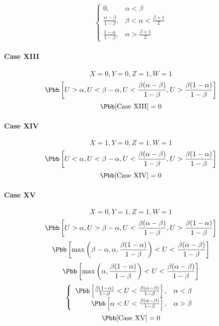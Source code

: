 \begin{displaymath}
\left\{\begin{array}{rl}
0, & \alpha < \beta\\
\frac{\alpha-\beta}{1-\beta}, & \beta < \alpha < \frac{\beta + 1}{2}\\
\frac{1-\alpha}{1-\beta}, & \alpha > \frac{\beta + 1}{2}
\end{array}\right.
\end{displaymath}

\paragraph{Case XIII}
\[X = 0, Y = 0, Z = 1, W = 1\]
\[\Pbb\left[U > \alpha, U < \beta-\alpha, U < \frac{\beta(\alpha-\beta)}{1-\beta}, U > \frac{\beta(1-\alpha)}{1-\beta}\right]\]
\[\Pbb[\mbox{Case XIII}] = 0\]

\paragraph{Case XIV}
\[X = 1, Y = 0, Z = 1, W = 1\]
\[\Pbb\left[U < \alpha, U < \beta-\alpha, U < \frac{\beta(\alpha-\beta)}{1-\beta}, U > \frac{\beta(1-\alpha)}{1-\beta}\right]\]
\[\Pbb[\mbox{Case XIV}] = 0\]

\paragraph{Case XV}
\[X = 0, Y = 1, Z = 1, W = 1\]
\[\Pbb\left[U > \alpha, U > \beta-\alpha, U < \frac{\beta(\alpha-\beta)}{1-\beta}, U > \frac{\beta(1-\alpha)}{1-\beta}\right]\]
\[\Pbb\left[\max\left(\beta-\alpha, \alpha, \frac{\beta(1-\alpha)}{1-\beta}\right) < U < \frac{\beta(\alpha-\beta)}{1-\beta}\right]\]
\[\Pbb\left[\max\left(\alpha, \frac{\beta(1-\alpha)}{1-\beta}\right) < U < \frac{\beta(\alpha-\beta)}{1-\beta}\right]\]
\begin{displaymath}
\left\{\begin{array}{rl}
\Pbb\left[\frac{\beta(1-\alpha)}{1-\beta} < U < \frac{\beta(\alpha-\beta)}{1-\beta}\right], & \alpha < \beta\\
\Pbb\left[\alpha < U < \frac{\beta(\alpha-\beta)}{1-\beta}\right], & \alpha > \beta
\end{array}\right.
\end{displaymath}
\[\Pbb[\mbox{Case XV}] = 0\]

